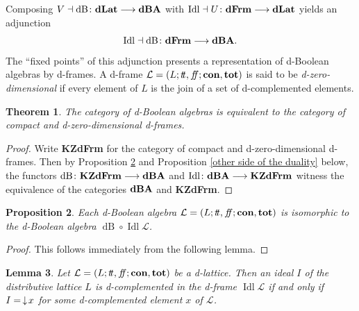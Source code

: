 \documentclass[11pt]{article}
\DeclareMathOperator{\idl}{Idl}
\DeclareMathOperator{\dB}{dB}
\theoremstyle{plain}
\newtheorem{thm}{Theorem}[section]
\newtheorem{lem}[thm]{Lemma}
\newtheorem{prop}[thm]{Proposition}
\theoremstyle{definition}
\newcommand{\dbt}{{t\!t}}
\newcommand{\dbf}{{f\!\!f}}
\newcommand{\dLat}{\bf dLat}
\newcommand{\dFrm}{\bf dFrm}
\newcommand{\dBoo}{\bf dBA}
\newcommand{\lra}{\longrightarrow}
\begin{document}
Composing  $V\dashv\dB\colon \dLat\lra\dBoo$ with   $\idl\dashv U\colon \dFrm\lra\dLat$ yields an adjunction $$\idl\dashv \dB\colon \dFrm\lra \dBoo.$$ The ``fixed points'' of this adjunction presents a representation of d-Boolean algebras by d-frames. 
A d-frame  $\mathcal{L}=(L;\dbt,\dbf;{\bf con},{\bf tot})$ is said to be \emph{d-zero-dimensional}  \cite[Definition 2.3.6]{Jakl}  if every element of $L$ is the join of a set of d-complemented elements.  
  
\begin{thm} \label{dBA vs dfrm}
The category of d-Boolean algebras is equivalent to the category of compact and d-zero-dimensional d-frames.
\end{thm}

\begin{proof} 
Write {\bf KZdFrm} for the category of compact and d-zero-dimensional d-frames. Then by Proposition \ref{one side of the duality} and Proposition \ref{other side of the duality} below, the functors $\dB\colon {\bf KZdFrm}\lra\dBoo$ and $\idl\colon \dBoo\lra{\bf KZdFrm}$ witness the equivalence of the categories $\dBoo$ and {\bf KZdFrm}. \end{proof}

\begin{prop}\label{one side of the duality} Each   d-Boolean algebra $\mathcal{L} =(L;\dbt,\dbf; {\bf con},{\bf tot})$  is isomorphic to the d-Boolean algebra    $\dB\circ\idl \mathcal{L}$. 
\end{prop}

\begin{proof} This follows immediately from the following lemma.
\end{proof}

\begin{lem}\label{d-complemented ideal} Let  
$\mathcal{L} =(L;\dbt,\dbf; {\bf con},{\bf tot})$ be a d-lattice. Then an ideal $I$ of the distributive lattice $L$ is d-complemented in the d-frame   $\idl\mathcal{L}$ if and only if $I= \thinspace \downarrow\!x$ for some d-complemented element $x$ of $\mathcal{L}$. \end{lem} 
\end{document}

